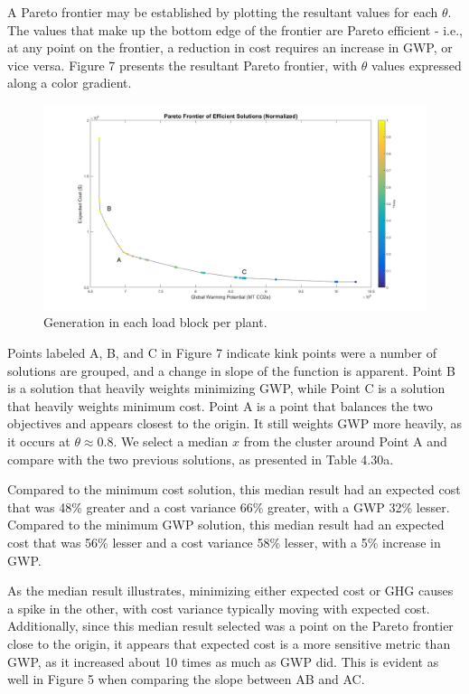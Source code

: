 \documentclass{article}
\begin{document}
	A Pareto frontier may be established by plotting the resultant values for each $\theta$. The values that make up the bottom edge of the frontier are Pareto efficient - i.e., at any point on the frontier, a reduction in cost requires an increase in GWP, or vice versa. Figure 7 presents the resultant Pareto frontier, with $\theta$ values expressed along a color gradient.
	
	\begin{figure}
		\includegraphics[width=\textwidth]{430_7_pareto_frontier}
		\caption{Generation in each load block per plant.}
	\end{figure}

	Points labeled A, B, and C in Figure 7 indicate kink points were a number of solutions are grouped, and a change in slope of the function is apparent. Point B is a solution that heavily weights minimizing GWP, while Point C is a solution that heavily weights minimum cost. Point A is a point that balances the two objectives and appears closest to the origin. It still weights GWP more heavily, as it occurs at $\theta \approx 0.8$. We select a median $x$ from the cluster around Point A and compare with the two previous solutions, as presented in Table 4.30a. 
	
	Compared to the minimum cost solution, this median result had an expected cost that was 48\% greater and a cost variance 66\% greater, with a GWP 32\% lesser. Compared to the minimum GWP solution, this median result had an expected cost that was 56\% lesser and a cost variance 58\% lesser, with a 5\% increase in GWP. 
	
	As the median result illustrates, minimizing either expected cost or GHG causes a spike in the other, with cost variance typically moving with expected cost. Additionally, since this median result selected was a point on the Pareto frontier close to the origin, it appears that expected cost is a more sensitive metric than GWP, as it increased about 10 times as much as GWP did. This is evident as well in Figure 5 when comparing the slope between AB and AC. 
\end{document}
